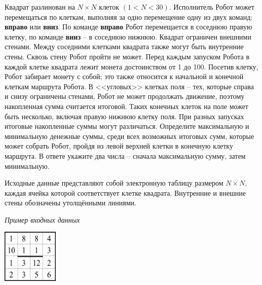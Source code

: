 \documentclass[14pt,a4paper]{article}
\begin{document}
Квадрат разлинован на $N \times N$ клеток $(1 < N < 30)$. Исполнитель
Робот может перемещаться по клеткам, выполняя за одно перемещение
одну из двух команд: \textbf{вправо} или \textbf{вниз}. По команде
\textbf{вправо} Робот перемещается в соседнюю правую клетку, по
команде \textbf{вниз} -- в соседнюю нижнюю. Квадрат ограничен
внешними стенами. Между соседними клетками квадрата также могут быть
внутренние стены. Сквозь стену Робот пройти не может. Перед каждым
запуском Робота в каждой клетке квадрата лежит монета достоинством от
1 до 100. Посетив клетку, Робот забирает монету с собой; это также
относится к начальной и конечной клеткам маршрута Робота. В
<<угловых>> клетках поля -- тех, которые справа и снизу ограничены
стенами, Робот не может продолжать движение, поэтому накопленная
сумма считается итоговой. Таких конечных клеток на поле может быть
несколько, включая правую нижнюю клетку поля. При разных запусках
итоговые накопленные суммы могут различаться. Определите максимальную
и минимальную денежные суммы, среди всех возможных итоговых сумм,
которые может собрать Робот, пройдя из левой верхней клетки в
конечную клетку маршрута. В ответе укажите два числа – сначала
максимальную сумму, затем минимальную.

Исходные данные представляют собой электронную таблицу размером $N
\times N$, каждая ячейка которой соответствует клетке квадрата.
Внутренние и внешние стены обозначены утолщёнными линиями.

\textit{Пример входных данных}

\begin{center}
    \includegraphics[width=0.2\textwidth]{example.png}
\end{center}
\end{document}
